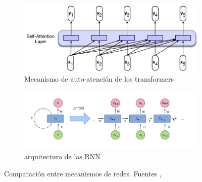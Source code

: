 \begin{figure}[!htbp]
	\centering
	\begin{subfigure}[b]{0.35\textwidth}
		\centering
		\includegraphics[scale=0.45]{Images & Logos/self-attention.png}
		\caption{Mecanismo de auto-atención de los transformers}
		\label{fig:auto-atencion}
	\end{subfigure}
	\hfill
	\begin{subfigure}[b]{0.52\textwidth}
		\centering
		\includegraphics[scale=0.36]{Images & Logos/Recurrent_neural_network_unfold.svg.png}
		\caption{arquitectura de las RNN}
		\label{fig:RNN}
	\end{subfigure}
    \caption{Comparación entre mecanismos de redes. Fuentes \cite{jurafsky2000speech}, \cite{enwiki:1109264340}}
	\label{fig:comparacion_modelos}
\end{figure}




